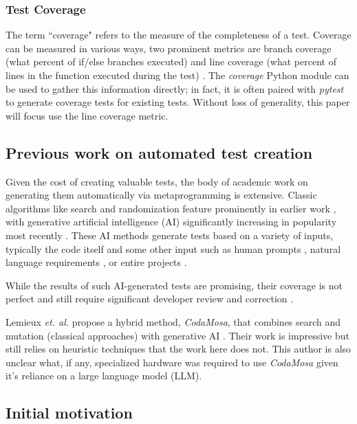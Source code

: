 \subsubsection{Test Coverage}\label{sec:intro-cov}
The term “coverage" refers to the measure of the completeness of a test.  
Coverage can be measured in various ways, two prominent metrics are branch coverage 
(what percent of if/else branches executed) and line coverage 
(what percent of lines in the function executed during the test) 
\cite{wang2024software}. The \textit{coverage} Python module can
be used to gather this information directly; in fact, it is often paired with 
\textit{pytest} to generate coverage tests for existing tests. Without loss of 
generality, this paper will focus use the line coverage metric.

\subsection{Previous work on automated test creation}\label{sec:intro-3}

Given the cost of creating valuable tests,
the body of academic work on generating them automatically 
via metaprogramming is extensive. Classic algorithms like search 
and randomization feature prominently in earlier work 
\cite{Luk22Pynguin0170}, with generative artificial intelligence (AI)
significantly increasing in popularity most recently
\cite{bhatia2023unit,takerngsaksiri2024tdd,wang2024software, kahur2023java}.
%
These AI methods generate tests based on a variety of inputs, typically the code
itself and some other input such as human prompts 
\cite{lahiri2023interactivecodegenerationtestdriven},
natural language requirements \cite{wang2024software}, or entire projects
\cite{rao2023cat}.  

While the results of such AI-generated tests are promising,
their coverage is not perfect \cite{kahur2023java} and still require significant
developer review and correction \cite{sundqvist2024ai}.  

Lemieux \textit{et. al.} propose a hybrid method, \textit{CodaMosa}, that 
combines search and mutation (classical approaches) with generative AI
\cite{lemieux2023codamosa}.  Their work is impressive but still relies on 
heuristic techniques that the work here does not. This author is also unclear 
what, if any, specialized hardware was required to use \textit{CodaMosa} given
it's reliance on a large language model (LLM).

\subsection{Initial motivation}\label{sec:intro-4}

